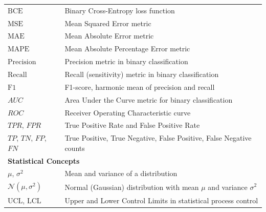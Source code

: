 \begin{appendices}
\begin{longtable}{p{}p{}}
    \midrule
    $\text{BCE}$                                & Binary Cross-Entropy loss function                                                   \\
    $\text{MSE}$                                & Mean Squared Error metric                                                            \\
    $\text{MAE}$                                & Mean Absolute Error metric                                                           \\
    $\text{MAPE}$                               & Mean Absolute Percentage Error metric                                                \\
    $\text{Precision}$                          & Precision metric in binary classification                                            \\
    $\text{Recall}$                             & Recall (sensitivity) metric in binary classification                                 \\
    $\text{F1}$                                 & F1-score, harmonic mean of precision and recall                                      \\
    $AUC$                                       & Area Under the Curve metric for binary classification                                \\
    $ROC$                                       & Receiver Operating Characteristic curve                                              \\
    $TPR$, $FPR$                                & True Positive Rate and False Positive Rate                                           \\
    $TP$, $TN$, $FP$, $FN$                      & True Positive, True Negative, False Positive, False Negative counts                  \\
    \midrule
    \multicolumn{2}{l}{\textbf{Statistical Concepts}}                                                                                  \\
    \midrule
    $\mu$, $\sigma^2$                           & Mean and variance of a distribution                                                  \\
    $\mathcal{N}(\mu,\sigma^2)$                 & Normal (Gaussian) distribution with mean $\mu$ and variance $\sigma^2$               \\
    $\text{UCL}$, $\text{LCL}$                  & Upper and Lower Control Limits in statistical process control                        \\

\end{longtable}
\end{appendices}
